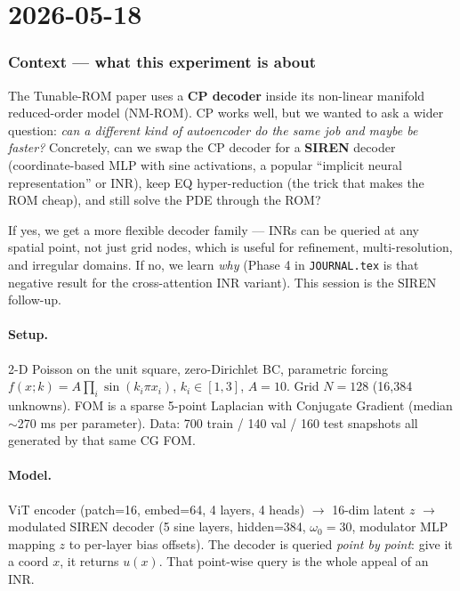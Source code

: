 \section{2026-05-18}


\subsubsection*{Context --- what this experiment is about}
The Tunable-ROM paper uses a \textbf{CP decoder} inside its non-linear
manifold reduced-order model (NM-ROM). CP works well, but we wanted to
ask a wider question: \emph{can a different kind of autoencoder do the
same job and maybe be faster?} Concretely, can we swap the CP decoder
for a \textbf{SIREN} decoder (coordinate-based MLP with sine
activations, a popular ``implicit neural representation'' or INR), keep
EQ hyper-reduction (the trick that makes the ROM cheap), and still
solve the PDE through the ROM?

If yes, we get a more flexible decoder family --- INRs can be queried
at any spatial point, not just grid nodes, which is useful for
refinement, multi-resolution, and irregular domains. If no, we learn
\emph{why} (Phase 4 in \texttt{JOURNAL.tex} is that negative result for
the cross-attention INR variant). This session is the SIREN follow-up.

\paragraph{Setup.} 2-D Poisson on the unit square, zero-Dirichlet BC,
parametric forcing $f(x;k) = A \prod_i \sin(k_i \pi x_i)$,
$k_i \in [1,3]$, $A=10$. Grid $N{=}128$ (16{,}384 unknowns). FOM is a
sparse 5-point Laplacian with Conjugate Gradient (median $\sim$270 ms
per parameter). Data: 700 train / 140 val / 160 test snapshots all
generated by that same CG FOM.

\paragraph{Model.} ViT encoder (patch=16, embed=64, 4 layers,
4 heads) $\rightarrow$ 16-dim latent $z$ $\rightarrow$ modulated SIREN
decoder (5 sine layers, hidden=384, $\omega_0{=}30$, modulator MLP
mapping $z$ to per-layer bias offsets). The decoder is queried
\emph{point by point}: give it a coord $x$, it returns $u(x)$. That
point-wise query is the whole appeal of an INR.

